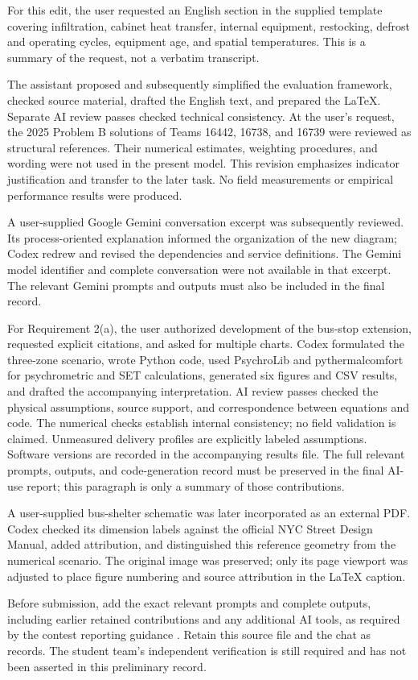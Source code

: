 \documentclass[12pt]{article}
\begin{document}
For this edit, the user requested an English section in the supplied template
covering infiltration, cabinet heat transfer, internal equipment, restocking,
defrost and operating cycles, equipment age, and spatial temperatures. This is
a summary of the request, not a verbatim transcript.

The assistant proposed and subsequently simplified the evaluation framework,
checked source material, drafted the English text, and prepared the LaTeX.
Separate AI review passes checked technical consistency. At the user's request,
the 2025 Problem B solutions of Teams 16442, 16738, and 16739 were reviewed as
structural references. Their numerical estimates, weighting procedures, and
wording were not used in the present model. This revision emphasizes indicator
justification and transfer to the later task. No field measurements or empirical
performance results were produced.

A user-supplied Google Gemini conversation excerpt was subsequently reviewed.
Its process-oriented explanation informed the organization of the new diagram;
Codex redrew and revised the dependencies and service definitions. The Gemini
model identifier and complete conversation were not available in that excerpt.
The relevant Gemini prompts and outputs must also be included in the final record.

For Requirement 2(a), the user authorized development of the bus-stop extension,
requested explicit citations, and asked for multiple charts. Codex formulated the
three-zone scenario, wrote Python code, used PsychroLib and pythermalcomfort for
psychrometric and SET calculations, generated six figures and CSV results, and
drafted the accompanying interpretation. AI review passes checked the physical
assumptions, source support, and correspondence between equations and code.
The numerical checks establish internal consistency; no field validation is
claimed. Unmeasured delivery profiles are explicitly labeled assumptions.
Software versions are recorded in the accompanying results file. The full
relevant prompts, outputs, and code-generation record must be preserved in the
final AI-use report; this paragraph is only a summary of those contributions.

A user-supplied bus-shelter schematic was later incorporated as an external PDF.
Codex checked its dimension labels against the official NYC Street Design Manual,
added attribution, and distinguished this reference geometry from the numerical
scenario. The original image was preserved; only its page viewport was adjusted
to place figure numbering and source attribution in the LaTeX caption.

Before submission, add the exact relevant prompts and complete outputs,
including earlier retained contributions and any additional AI tools, as
required by the contest reporting guidance \cite{aipolicy}. Retain this source
file and the chat as records. The student team's independent verification is
still required and has not been asserted in this preliminary record.
\end{document}
